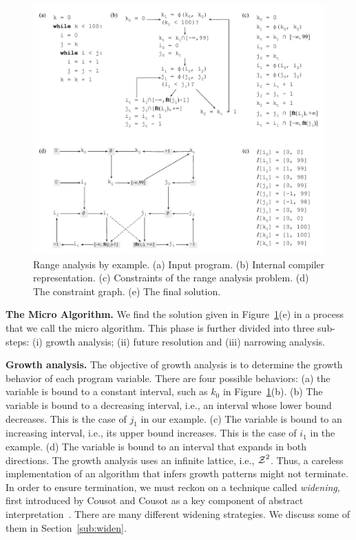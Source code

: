 \documentclass{paper}
\newcommand{\varset}[1]{\mbox{$\cal{#1}$}}
\begin{document}
\begin{figure}[t!]
\begin{center}
\includegraphics[width=\textwidth]{images/overall_view}
\end{center}
\caption{\label{fig:overall_view}
Range analysis by example.
(a) Input program.
(b) Internal compiler representation.
(c) Constraints of the range analysis problem.
(d) The constraint graph.
(e) The final solution.}
\end{figure}

\noindent
\textbf{The Micro Algorithm.}
We find the solution given in Figure~\ref{fig:overall_view}(e) in a
process that we call the micro algorithm.
This phase is further divided into three sub-steps:
(i) growth analysis;
(ii) future resolution and
(iii) narrowing analysis.

\noindent
\textbf{Growth analysis. }
The objective of growth analysis is to determine the growth behavior of
each program variable.
There are four possible behaviors:
(a) the variable is bound to a constant interval,
such as $k_0$ in Figure~\ref{fig:overall_view}(b).
(b) The variable is bound to a decreasing interval, i.e., an interval whose
lower bound decreases.
This is the case of $j_1$ in our example.
(c) The variable is bound to an increasing interval, i.e., its upper bound
increases.
This is the case of $i_1$ in the example.
(d) The variable is bound to an interval that expands in both directions.
The growth analysis uses an infinite lattice, i.e., $\varset{Z}^2$.
Thus, a careless implementation of an algorithm that infers growth patterns
might not terminate.
In order to ensure termination, we must reckon on a technique called
{\em widening}, first introduced by Cousot and Cousot as a key component
of abstract interpretation~\cite{Cousot77}.
There are many different widening strategies.
We discuss some of them in Section~\ref{sub:widen}.
\end{document}
